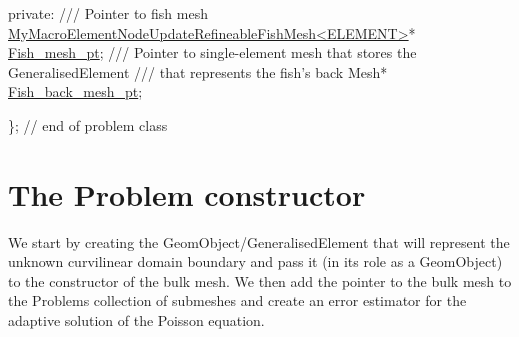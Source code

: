 \begin{DoxyCodeInclude}
\textcolor{keyword}{private}:
\textcolor{comment}{}
\textcolor{comment}{ /// Pointer to fish mesh}
\textcolor{comment}{} \hyperlink{classMyMacroElementNodeUpdateRefineableFishMesh}{MyMacroElementNodeUpdateRefineableFishMesh<ELEMENT>}* 
      \hyperlink{classFreeBoundaryPoissonProblem_ae81a7e22c2c61854696b80a94053a663}{Fish\_mesh\_pt};
\textcolor{comment}{}
\textcolor{comment}{ /// Pointer to single-element mesh that stores the GeneralisedElement}
\textcolor{comment}{ /// that represents the fish's back}
\textcolor{comment}{} Mesh* \hyperlink{classFreeBoundaryPoissonProblem_aaa45902e79f963060b4b6820c5383cfc}{Fish\_back\_mesh\_pt};

\}; \textcolor{comment}{// end of problem class}

\end{DoxyCodeInclude}




 

\hypertarget{index_constructor}{}\section{The Problem constructor}\label{index_constructor}
We start by creating the {\ttfamily Geom\+Object/\+Generalised\+Element} that will represent the unknown curvilinear domain boundary and pass it (in its role as a {\ttfamily Geom\+Object}) to the constructor of the bulk mesh. We then add the pointer to the bulk mesh to the {\ttfamily Problem\textquotesingle{}s} collection of submeshes and create an error estimator for the adaptive solution of the Poisson equation.


